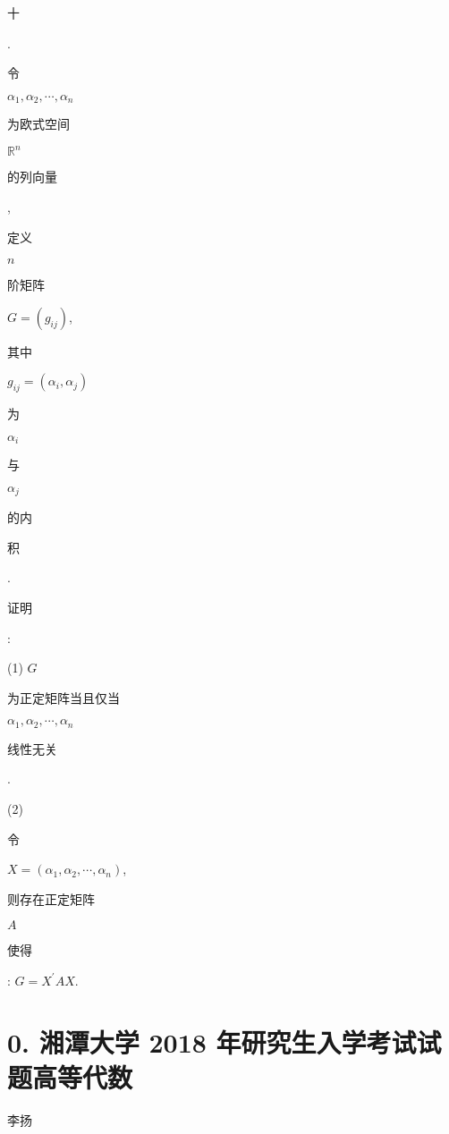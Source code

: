 \documentclass[10pt]{article}
\begin{document}
\begin{CJK}{UTF8}{mj}十\end{CJK}. \begin{CJK}{UTF8}{mj}令\end{CJK} $\alpha_{1}, \alpha_{2}, \cdots, \alpha_{n}$ \begin{CJK}{UTF8}{mj}为欧式空间\end{CJK} $\mathbb{R}^{n}$ \begin{CJK}{UTF8}{mj}的列向量\end{CJK}, \begin{CJK}{UTF8}{mj}定义\end{CJK} $n$ \begin{CJK}{UTF8}{mj}阶矩阵\end{CJK} $G=\left(g_{i j}\right)$, \begin{CJK}{UTF8}{mj}其中\end{CJK} $g_{i j}=\left(\alpha_{i}, \alpha_{j}\right)$ \begin{CJK}{UTF8}{mj}为\end{CJK} $\alpha_{i}$ \begin{CJK}{UTF8}{mj}与\end{CJK} $\alpha_{j}$ \begin{CJK}{UTF8}{mj}的内\end{CJK} \begin{CJK}{UTF8}{mj}积\end{CJK}. \begin{CJK}{UTF8}{mj}证明\end{CJK}:

(1) $G$ \begin{CJK}{UTF8}{mj}为正定矩阵当且仅当\end{CJK} $\alpha_{1}, \alpha_{2}, \cdots, \alpha_{n}$ \begin{CJK}{UTF8}{mj}线性无关\end{CJK}.

(2) \begin{CJK}{UTF8}{mj}令\end{CJK} $X=\left(\alpha_{1}, \alpha_{2}, \cdots, \alpha_{n}\right)$, \begin{CJK}{UTF8}{mj}则存在正定矩阵\end{CJK} $A$ \begin{CJK}{UTF8}{mj}使得\end{CJK}: $G=X^{\prime} A X$.

\section{0. 湘潭大学 2018 年研究生入学考试试题高等代数}
\begin{CJK}{UTF8}{mj}李扬\end{CJK}
\end{document}
